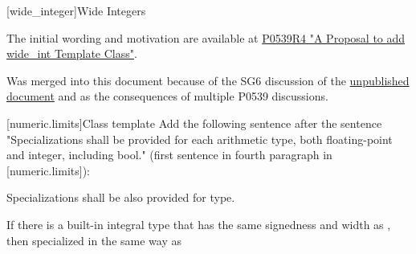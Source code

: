 
[wide_integer]{Wide Integers}

\begin{reviewnote}
The initial wording and motivation are available at \href{https://wg21.link/P0539R4}{P0539R4 "A Proposal to add wide_int Template Class"}.

Was merged into this document because of the SG6 discussion of the \href{http://wiki.edg.com/pub/Wg21cologne2019/SG6/specification.html}{unpublished document} and as the consequences of multiple P0539 discussions.
\end{reviewnote}

%
[numeric.limits]{Class template }
Add the following sentence after the sentence "Specializations shall be provided for each arithmetic type, both floating-point and integer, including bool." (first sentence in fourth paragraph in [numeric.limits]):

\begin{addedblock}
Specializations shall be also provided for  type.

\begin{note}
If there is a built-in integral type  that has the same signedness and width as , then  specialized in the same way as 
\end{note}
\end{addedblock}


